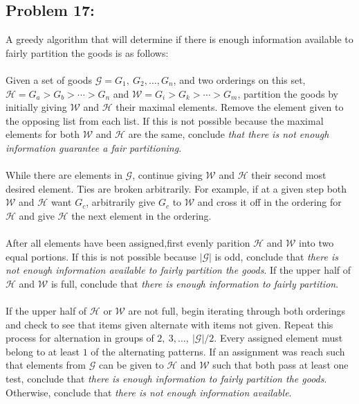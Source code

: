 \documentclass[12pt]{article}
\begin{document}
\subsection*{Problem 17:}
A greedy algorithm that will determine if there is enough
information available to fairly partition the goods is as 
follows:\\\\
Given a set of goods $\mathcal{G}={G_1,\ G_2,\dots,G_n}$,
and two orderings on this set, $\mathcal{H}=G_a > G_b >
\cdots > G_n$ and $\mathcal{W}=G_i > G_k > \cdots > G_m$,
partition the goods by initially giving $\mathcal{W}$ and 
$\mathcal{H}$ their maximal elements.
Remove the element given to the opposing list from each list.
If this is not possible
because the maximal elements for both $\mathcal{W}$ and
$\mathcal{H}$ are the same, conclude \textit{that there is not
enough information guarantee a fair partitioning}.\\\\  
While there are elements in $\mathcal{G}$, continue
giving $\mathcal{W}$ and $\mathcal{H}$ their second
most desired element.  Ties are broken arbitrarily.  For 
example, if at a given step both $\mathcal{W}$ and $\mathcal{H}$
want $G_c$, arbitrarily give $G_c$ to $\mathcal{W}$ and
cross it off in the ordering for $\mathcal{H}$ and give
$\mathcal{H}$ the next element in the ordering.\\\\
After all elements have been assigned,first evenly parition  
$\mathcal{H}$ and $\mathcal{W}$ into two equal portions.
If this is not possible because $|\mathcal{G}|$ is odd,
conclude that \textit{there is not enough information available
to fairly partition the goods}.  If the upper half of  
$\mathcal{H}$ and $\mathcal{W}$ is full, conclude that 
\textit{there is enough information to fairly partition}.\\\\
If the upper half of $\mathcal{H}$ or $\mathcal{W}$ are
not full, begin iterating through both orderings and 
check to see that items given alternate with items not given.
Repeat this process for alternation in groups of $2,\ 3,\dots
,\ |\mathcal{G}|/2$.  Every assigned element must belong
to at least $1$ of the alternating patterns.
If an assignment was reach such that elements from $\mathcal{G}$
can be given to $\mathcal{H}$ and $\mathcal{W}$ such that both
pass at least one test, conclude that \textit{there is enough
information to fairly partition the goods}.  Otherwise, conclude
that \textit{there is not enough information available}.
\end{document}

